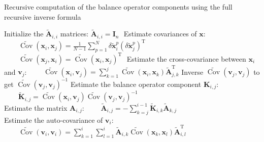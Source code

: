 \documentclass[12pt]{article}
\DeclareMathOperator{\Cov}{Cov}
\begin{document}
\begin{algorithm}[!ht]
\caption{Recursive computation of the balance operator components using the full recursive inverse formula \label{algo:full}}
\begin{algorithmic}
\STATE Initialize the $\widetilde{\mathbf{A}}_{i,i}$ matrices:
\STATE $\widetilde{\mathbf{A}}_{i,i} = \mathbf{I}_n$
\ENDFOR
\STATE $ $
\STATE Estimate covariances of $\mathbf{x}$:
\STATE $\displaystyle \qquad \widetilde{\Cov}\left(\mathbf{x}_i,\mathbf{x}_j\right) = \frac{1}{N-1} \sum_{p=1}^N \delta \widetilde{\mathbf{x}}^p_i \left(\delta \widetilde{\mathbf{x}}^p_j\right)^\mathrm{T}$
\STATE $\displaystyle \qquad \widetilde{\Cov}\left(\mathbf{x}_j,\mathbf{x}_i\right) = \widetilde{\Cov}\left(\mathbf{x}_i,\mathbf{x}_j\right)^\mathrm{T}$
\ENDFOR
\ENDFOR
\STATE $ $
\STATE Estimate the cross-covariance between $\mathbf{x}_i$ and $\mathbf{v}_j$:
\STATE $\displaystyle \qquad \widetilde{\Cov}\left(\mathbf{x}_i,\mathbf{v}_j\right) = \sum_{k=1}^j \widetilde{\Cov} \left(\mathbf{x}_i,\mathbf{x}_k\right) \widetilde{\mathbf{A}}_{j,k}^\mathrm{T}$
\STATE Inverse $\widetilde{\Cov}\left(\mathbf{v}_j,\mathbf{v}_j\right)$ to get $\widetilde{\Cov} \left(\mathbf{v}_j,\mathbf{v}_j\right)^{-1}$
\STATE Estimate the balance operator component $\mathbf{K}_{i,j}$:
\STATE $\displaystyle \qquad \widetilde{\mathbf{K}}_{i,j} = \widetilde{\Cov} \left(\mathbf{x}_i,\mathbf{v}_j\right)\widetilde{\Cov} \left(\mathbf{v}_j,\mathbf{v}_j\right)^{-1}$
\ENDFOR
\STATE $  $\\
\STATE Estimate the matrix $\mathbf{A}_{i,j}$:
\STATE $\displaystyle \qquad \widetilde{\mathbf{A}}_{i,j} = - \sum_{k=j}^{i-1} \widetilde{\mathbf{K}}_{i,k} \widetilde{\mathbf{A}}_{k,j}$
\ENDFOR
\STATE $  $\\
\STATE Estimate the auto-covariance of $\mathbf{v}_i$:
\STATE $\displaystyle \qquad \widetilde{\Cov}\left(\mathbf{v}_i,\mathbf{v}_i\right) = \sum_{k=1}^i \sum_{l=1}^i \widetilde{\mathbf{A}}_{i,k} \widetilde{\Cov}\left(\mathbf{x}_k,\mathbf{x}_l\right) \widetilde{\mathbf{A}}_{i,l}^\mathrm{T}$
\ENDFOR
\end{algorithmic}
\end{algorithm}
\end{document}
